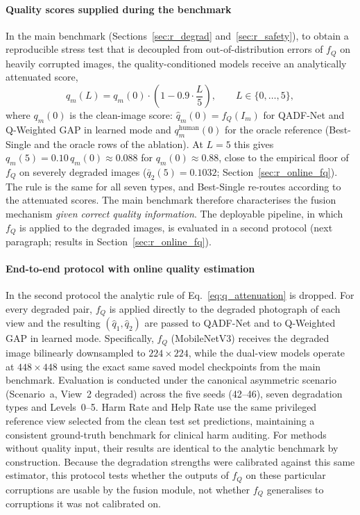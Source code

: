 \documentclass[final,5p,times,twocolumn,authoryear]{elsarticle}
\newcommand{\qadfnet}{QADF-Net}
\theoremstyle{plain}
\theoremstyle{remark}
\begin{document}
\paragraph{Quality scores supplied during the benchmark} In the main benchmark (Sections~\ref{sec:r_degrad} and~\ref{sec:r_safety}), to obtain a reproducible stress test that is decoupled from out-of-distribution errors of $f_Q$ on heavily corrupted images, the quality-conditioned models receive an analytically attenuated score,
\begin{equation}
  q_m(L) = q_m(0) \cdot \left(1 - 0.9 \cdot \frac{L}{5}\right), \qquad L \in \{0,\dots,5\},
  \label{eq:q_attenuation}
\end{equation}
where $q_m(0)$ is the clean-image score: $\hat{q}_m(0) = f_Q(I_m)$ for \qadfnet{} and Q-Weighted GAP in learned mode and $q_m^{\text{human}}(0)$ for the oracle reference (Best-Single and the oracle rows of the ablation). At $L=5$ this gives $q_m(5) = 0.10\,q_m(0) \approx 0.088$ for $q_m(0) \approx 0.88$, close to the empirical floor of $f_Q$ on severely degraded images ($\bar{q}_2(5) = 0.1032$; Section~\ref{sec:r_online_fq}). The rule is the same for all seven types, and Best-Single re-routes according to the attenuated scores. The main benchmark therefore characterises the fusion mechanism \emph{given correct quality information}. The deployable pipeline, in which $f_Q$ is applied to the degraded images, is evaluated in a second protocol (next paragraph; results in Section~\ref{sec:r_online_fq}).

\paragraph{End-to-end protocol with online quality estimation} In the second protocol the analytic rule of Eq.~\eqref{eq:q_attenuation} is dropped. For every degraded pair, $f_Q$ is applied directly to the degraded photograph of each view and the resulting $(\hat q_1, \hat q_2)$ are passed to \qadfnet{} and to Q-Weighted GAP in learned mode. Specifically, $f_Q$ (MobileNetV3) receives the degraded image bilinearly downsampled to $224\times224$, while the dual-view models operate at $448\times448$ using the exact same saved model checkpoints from the main benchmark. Evaluation is conducted under the canonical asymmetric scenario (Scenario~a, View~2 degraded) across the five seeds (42--46), seven degradation types and Levels~0--5. Harm Rate and Help Rate use the same privileged reference view selected from the clean test set predictions, maintaining a consistent ground-truth benchmark for clinical harm auditing. For methods without quality input, their results are identical to the analytic benchmark by construction. Because the degradation strengths were calibrated against this same estimator, this protocol tests whether the outputs of $f_Q$ on these particular corruptions are usable by the fusion module, not whether $f_Q$ generalises to corruptions it was not calibrated on.
\end{document}
